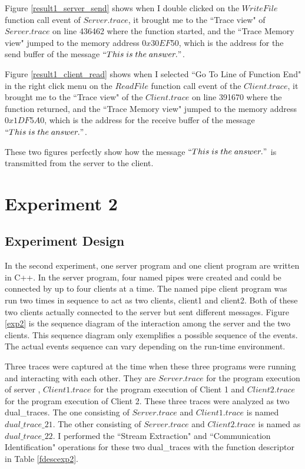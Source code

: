 Figure \ref{result1_server_send} shows when I double clicked on the $WriteFile$ function call event of $Server.trace$, it brought me to the ``Trace view" of $Server.trace$ on line 436462 where the function started, and the ``Trace Memory view" jumped to the memory address $0x30EF50$, which is the address for the send buffer of the message $``This\; is\; the\; answer."$.

Figure \ref{result1_client_read} shows when I selected ``Go To Line of Function End" in the right click menu on the $ReadFile$ function call event of the $Client.trace$, it brought me to the ``Trace view" of the $Client.trace$ on line 391670 where the function returned, and the ``Trace Memory view" jumped to the memory address $0x1DF5A0$, which is the address for the receive buffer of the message $``This\; is\; the\; answer."$.

These two figures perfectly show how the message $``This\; is\; the\; answer."$ is transmitted from the server to the client.

\section{Experiment 2}
\subsection{Experiment Design}
In the second experiment, one server program and one client program are written in C++. In the server program, four named pipes were created and could be connected by up to four clients at a time. The named pipe client program was run two times in sequence to act as two clients, client1 and client2. Both of these two clients actually connected to the server but sent different messages. Figure \ref{exp2} is the sequence diagram of the interaction among the server and the two clients. This sequence diagram only exemplifies a possible sequence of the events. The actual events sequence can vary depending on the run-time environment. 

Three traces were captured at the time when these three programs were running and interacting with each other. They are $Server.trace$ for the program execution of server , $Client1.trace$ for the program execution of Client 1 and $Client2.trace$ for the program execution of Client 2. These three traces were analyzed as two dual\_traces. The one consisting of $Server.trace$ and $Client1.trace$ is named $dual\_trace\_21$. The other consisting of $Server.trace$ and $Client2.trace$ is named as $dual\_trace\_22$. I performed the ``Stream Extraction" and ``Communication Identification" operations for these two dual\_traces with the function descriptor in Table \ref{fdescexp2}.

